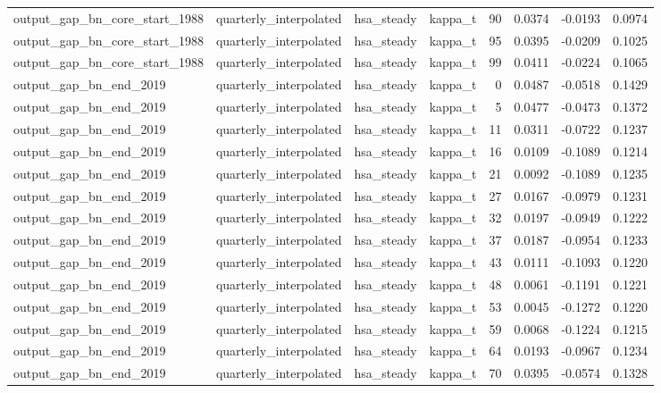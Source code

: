 \begin{tabular}{llllrrrr}
output\_gap\_bn\_core\_start\_1988 & quarterly\_interpolated & hsa\_steady & kappa\_t & 90 & 0.0374 & -0.0193 & 0.0974 \\
output\_gap\_bn\_core\_start\_1988 & quarterly\_interpolated & hsa\_steady & kappa\_t & 95 & 0.0395 & -0.0209 & 0.1025 \\
output\_gap\_bn\_core\_start\_1988 & quarterly\_interpolated & hsa\_steady & kappa\_t & 99 & 0.0411 & -0.0224 & 0.1065 \\
output\_gap\_bn\_end\_2019 & quarterly\_interpolated & hsa\_steady & kappa\_t & 0 & 0.0487 & -0.0518 & 0.1429 \\
output\_gap\_bn\_end\_2019 & quarterly\_interpolated & hsa\_steady & kappa\_t & 5 & 0.0477 & -0.0473 & 0.1372 \\
output\_gap\_bn\_end\_2019 & quarterly\_interpolated & hsa\_steady & kappa\_t & 11 & 0.0311 & -0.0722 & 0.1237 \\
output\_gap\_bn\_end\_2019 & quarterly\_interpolated & hsa\_steady & kappa\_t & 16 & 0.0109 & -0.1089 & 0.1214 \\
output\_gap\_bn\_end\_2019 & quarterly\_interpolated & hsa\_steady & kappa\_t & 21 & 0.0092 & -0.1089 & 0.1235 \\
output\_gap\_bn\_end\_2019 & quarterly\_interpolated & hsa\_steady & kappa\_t & 27 & 0.0167 & -0.0979 & 0.1231 \\
output\_gap\_bn\_end\_2019 & quarterly\_interpolated & hsa\_steady & kappa\_t & 32 & 0.0197 & -0.0949 & 0.1222 \\
output\_gap\_bn\_end\_2019 & quarterly\_interpolated & hsa\_steady & kappa\_t & 37 & 0.0187 & -0.0954 & 0.1233 \\
output\_gap\_bn\_end\_2019 & quarterly\_interpolated & hsa\_steady & kappa\_t & 43 & 0.0111 & -0.1093 & 0.1220 \\
output\_gap\_bn\_end\_2019 & quarterly\_interpolated & hsa\_steady & kappa\_t & 48 & 0.0061 & -0.1191 & 0.1221 \\
output\_gap\_bn\_end\_2019 & quarterly\_interpolated & hsa\_steady & kappa\_t & 53 & 0.0045 & -0.1272 & 0.1220 \\
output\_gap\_bn\_end\_2019 & quarterly\_interpolated & hsa\_steady & kappa\_t & 59 & 0.0068 & -0.1224 & 0.1215 \\
output\_gap\_bn\_end\_2019 & quarterly\_interpolated & hsa\_steady & kappa\_t & 64 & 0.0193 & -0.0967 & 0.1234 \\
output\_gap\_bn\_end\_2019 & quarterly\_interpolated & hsa\_steady & kappa\_t & 70 & 0.0395 & -0.0574 & 0.1328 \\

\end{tabular}
